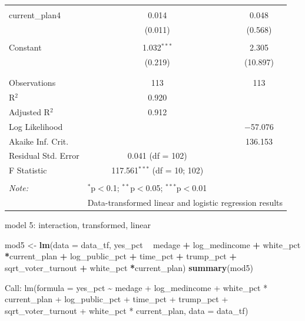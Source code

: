 \documentclass[
]{article}
\newenvironment{Shaded}{\begin{snugshade}}{\end{snugshade}}
\newcommand{\DataTypeTok}[1]{\textcolor[rgb]{0.13,0.29,0.53}{#1}}
\newcommand{\KeywordTok}[1]{\textcolor[rgb]{0.13,0.29,0.53}{\textbf{#1}}}
\newcommand{\NormalTok}[1]{#1}
\newcommand{\OperatorTok}[1]{\textcolor[rgb]{0.81,0.36,0.00}{\textbf{#1}}}
\newcommand{\StringTok}[1]{\textcolor[rgb]{0.31,0.60,0.02}{#1}}
\begin{document}
\begin{table}[!htbp]
\begin{tabular}{@{\extracolsep{5pt}}lcc}
  & & \\ 
 current\_plan4 & 0.014 & 0.048 \\ 
  & (0.011) & (0.568) \\ 
  & & \\ 
 Constant & 1.032$^{***}$ & 2.305 \\ 
  & (0.219) & (10.897) \\ 
  & & \\ 
\hline \\[-1.8ex] 
Observations & 113 & 113 \\ 
R$^{2}$ & 0.920 &  \\ 
Adjusted R$^{2}$ & 0.912 &  \\ 
Log Likelihood &  & $-$57.076 \\ 
Akaike Inf. Crit. &  & 136.153 \\ 
Residual Std. Error & 0.041 (df = 102) &  \\ 
F Statistic & 117.561$^{***}$ (df = 10; 102) &  \\ 
\hline 
\hline \\[-1.8ex] 
\textit{Note:}  & \multicolumn{2}{l}{$^{*}$p$<$0.1; $^{**}$p$<$0.05; $^{***}$p$<$0.01} \\ 
 & \multicolumn{2}{l}{Data-transformed linear and logistic regression results} \\ 
\end{tabular} 
\end{table}

model 5: interaction, transformed, linear

\begin{Shaded}
\begin{Highlighting}[]
\NormalTok{mod5 <-}\StringTok{ }\KeywordTok{lm}\NormalTok{(}\DataTypeTok{data =}\NormalTok{ data_tf, yes_pct }\OperatorTok{~}\StringTok{ }\NormalTok{medage }\OperatorTok{+}\StringTok{ }\NormalTok{log_medincome }\OperatorTok{+}\StringTok{ }\NormalTok{white_pct }\OperatorTok{*}\NormalTok{current_plan }\OperatorTok{+}\StringTok{  }\NormalTok{log_public_pct }\OperatorTok{+}\StringTok{ }\NormalTok{time_pct }\OperatorTok{+}\StringTok{ }\NormalTok{trump_pct }\OperatorTok{+}\StringTok{ }\NormalTok{sqrt_voter_turnout }\OperatorTok{+}\StringTok{ }\NormalTok{white_pct }\OperatorTok{*}\NormalTok{current_plan)}
\KeywordTok{summary}\NormalTok{(mod5)}
\end{Highlighting}
\end{Shaded}

Call: lm(formula = yes\_pct \textasciitilde{} medage + log\_medincome +
white\_pct * current\_plan + log\_public\_pct + time\_pct + trump\_pct +
sqrt\_voter\_turnout + white\_pct * current\_plan, data = data\_tf)
\end{document}
